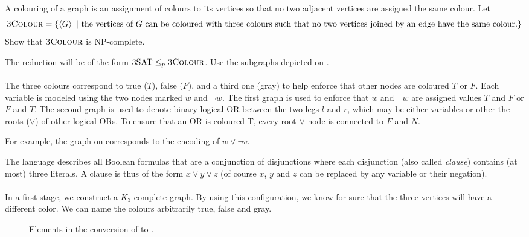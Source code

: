 \documentclass{article}
\begin{document}
\begin{exercise}
A colouring of a graph is an assignment of colours to its vertices so that no two adjacent vertices are assigned the same colour. Let
\begin{equation}
\mbox{\textsc{3Colour}}=\left\{ \left\langle G \right\rangle\ |\ \mbox{the vertices of $G$ can be coloured with three colours such that no two vertices joined by an edge have the same colour.} \right\}
\end{equation}
Show that $\mbox{\textsc{3Colour}}$ is $\mbox{NP-complete}$.
\begin{hint}
The reduction will be of the form $\mbox{3SAT}\leq_p\mbox{\textsc{3Colour}}$. Use the subgraphs depicted on .
\paragraph{}
The three colours correspond to true ($T$), false ($F$), and a third one (gray) to help enforce that other nodes are coloured $T$ or $F$. Each variable is modeled using the two nodes marked $w$ and $\neg w$. The first graph is used to enforce that $w$ and $\neg w$ are assigned values $T$ and $F$ or $F$ and $T$. The second graph is used to denote binary logical OR between the two legs $l$ and $r$, which may be either variables or other the roots ($\vee$) of other logical ORs. To ensure that an OR is coloured T, every root $\vee$-node is connected to $F$ and $N$.
\begin{example}
For example, the graph on  corresponds to the encoding of $w\vee\neg v$.
\end{example}
\end{hint}
\begin{answer}
The  language describes all Boolean formulas that are a conjunction of disjunctions where each disjunction (also called \emph{clause}) contains (at most) three literals. A clause is thus of the form $x\vee y\vee z$ (of course $x$, $y$ and $z$ can be replaced by any variable or their negation).
\paragraph{}
In a first stage, we construct a $K_3$ complete graph. By using this configuration, we know for sure that the three vertices will have a different color. We can name the colours arbitrarily true, false and gray. 
\begin{figure}[hbt]
\centering
{}
\caption{Elements in the conversion of  to .}
\end{figure}
\end{answer}
\end{exercise}
\end{document}
